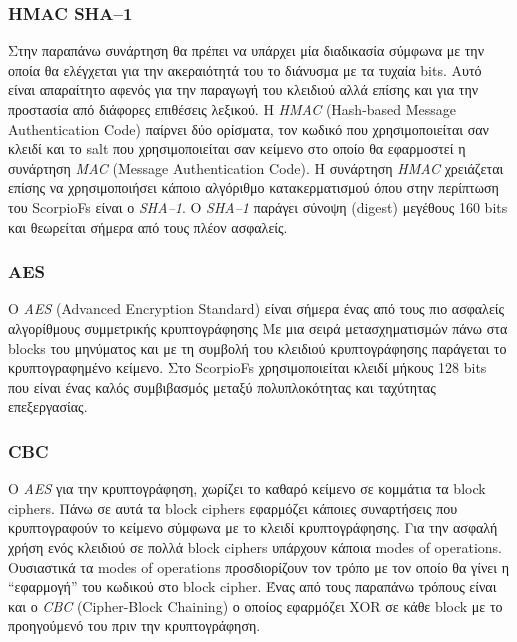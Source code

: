 \documentclass[a4paper]{article}
\begin{document}
\subsubsection{HMAC SHA--1}
Στην παραπάνω συνάρτηση θα πρέπει να υπάρχει μία διαδικασία σύμφωνα με την οποία
θα ελέγχεται για την ακεραιότητά του το διάνυσμα με τα τυχαία bits. Αυτό είναι
απαραίτητο αφενός για την παραγωγή του κλειδιού αλλά επίσης και για την
προστασία από διάφορες επιθέσεις λεξικού. Η \emph{HMAC} (Hash-based Message
Authentication Code) παίρνει δύο ορίσματα, τον κωδικό που χρησιμοποιείται σαν
κλειδί και το salt που χρησιμοποιείται σαν κείμενο στο οποίο θα εφαρμοστεί η
συνάρτηση \emph{MAC} (Message Authentication Code). Η συνάρτηση \emph{HMAC}
χρειάζεται επίσης να χρησιμοποιήσει κάποιο αλγόριθμο κατακερματισμού όπου στην
περίπτωση του ScorpioFs είναι ο \emph{SHA--1}. O \emph{SHA--1} παράγει σύνοψη
(digest) μεγέθους 160 bits και θεωρείται σήμερα από τους πλέον ασφαλείς.

\subsubsection{AES}
Ο \emph{AES} (Advanced Encryption Standard) είναι σήμερα ένας από τους πιο
ασφαλείς αλγορίθμους συμμετρικής κρυπτογράφησης Με μια σειρά μετασχηματισμών
πάνω στα blocks του μηνύματος και με τη συμβολή του κλειδιού κρυπτογράφησης
παράγεται το κρυπτογραφημένο κείμενο. Στο ScorpioFs χρησιμοποιείται κλειδί
μήκους 128 bits που είναι ένας καλός συμβιβασμός μεταξύ πολυπλοκότητας και
ταχύτητας επεξεργασίας.

\subsubsection{CBC}
Ο \emph{AES} για την κρυπτογράφηση, χωρίζει το καθαρό κείμενο σε κομμάτια τα
block ciphers. Πάνω σε αυτά τα block ciphers εφαρμόζει κάποιες συναρτήσεις που
κρυπτογραφούν το κείμενο σύμφωνα με το κλειδί κρυπτογράφησης. Για την ασφαλή
χρήση ενός κλειδιού σε πολλά block ciphers υπάρχουν κάποια modes of operations.
Ουσιαστικά τα modes of operations προσδιορίζουν τον τρόπο με τον οποίο θα γίνει
η ``εφαρμογή'' του κωδικού στο block cipher. Ένας από τους παραπάνω τρόπους
είναι και ο \emph{CBC} (Cipher-Block Chaining) ο οποίος εφαρμόζει XOR σε κάθε
block με το προηγούμενό του πριν την κρυπτογράφηση.
\end{document}
